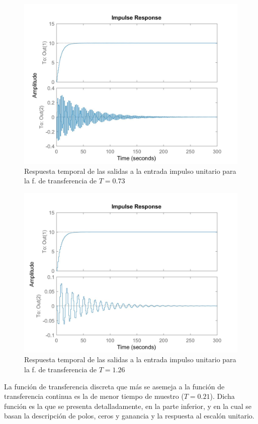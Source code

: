 \documentclass[journal]{IEEEtran}
\begin{document}
\begin{figure}[t]
\caption{Respuesta temporal de las salidas a la entrada impulso unitario para la f. de transferencia de $T=0.73$\label{fig:impulseGd1}}
  \centering
\includegraphics[scale=0.18]{tf/impulse_Gd_1.jpg}
\end{figure}

\begin{figure}[t]
\caption{Respuesta temporal de las salidas a la entrada impulso unitario para la f. de transferencia de $T=1.26$\label{fig:impulseGd2}}
  \centering
\includegraphics[scale=0.18]{tf/impulse_Gd_2.jpg}
\end{figure}

La función de transferencia discreta que más se asemeja a la función de transferencia continua es la de menor tiempo de muestro ($T=0.21$). Dicha función es la que se presenta detalladamente, en la parte inferior, y en la cual se basan la descripción de polos, ceros y ganancia y la respuesta al escalón unitario.\\
\end{document}
